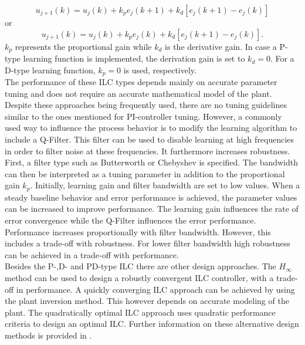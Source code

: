 \begin{equation}
    u_{j+1}(k) = u_{j}(k)+k_{p}e_{j}(k+1)+k_{d}[e_{j}(k+1)-e_{j}(k)]
 \label{eq:PD_type}
 \end{equation}
 or
 \begin{equation}
     u_{j+1}(k) = u_{j}(k)+k_{p}e_{j}(k)+k_{d}[e_{j}(k+1)-e_{j}(k)].
  \label{eq:PD_type_2}
  \end{equation}
$k_{p}$ represents the proportional gain while $k_{d}$ is the derivative gain. In case a P-type learning function is implemented, the derivation gain is set to $k_{d}=0$. For a D-type learning function, $k_{p}=0$ is used, respectively.
\\The performance of these ILC types depends mainly on accurate parameter tuning and does not require an accurate mathematical model of the plant. Despite these approaches being frequently used, there are no tuning guidelines similar to the ones mentioned for PI-controller tuning. However, a commonly used way to influence the process behavior is to modify the learning algorithm to include a Q-Filter. This filter can be used to disable learning at high frequencies in order to filter noise at these frequencies. It furthermore increases robustness. First, a filter type such as Butterworth or Chebyshev is specified. The bandwidth can then be interpreted as a tuning parameter in addition to the proportional gain $k_{p}$. Initially, learning gain and filter bandwidth are set to low values. When a steady baseline behavior and error performance is achieved, the parameter values can be increased to improve performance. The learning gain influences the rate of error convergence while the Q-Filter influences the error performance. Performance increases proportionally with filter bandwidth. However, this includes a trade-off with robustness. For lower filter bandwidth high robustness can be achieved in a trade-off with performance.
\\Besides the P-,D- and PD-type ILC there are other design approaches. The $H_{\infty}$ method can be used to design a robustly convergent ILC controller, with a trade-off in performance. A quickly converging ILC approach can be achieved by using the plant inversion method. This however depends on accurate modeling of the plant. The quadratically optimal ILC approach uses quadratic performance criteria to design an optimal ILC. Further information on these alternative design methods is provided in \cite{ILC2}.
